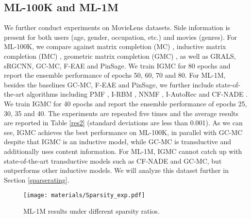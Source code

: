 \documentclass{article} \usepackage{iclr2020_conference,times}
\begin{document}
\subsection{ML-100K and ML-1M}
We further conduct experiments on MovieLens datasets. Side information is present for both users (age, gender, occupation, etc.) and movies (genres). For ML-100K, we compare against matrix completion (MC) \citep{candes2009exact}, inductive matrix completion (IMC) \citep{jain2013provable}, geometric matrix completion (GMC) \citep{kalofolias2014matrix}, as well as GRALS, sRGCNN, GC-MC, F-EAE and PinSage. We train IGMC for 80 epochs and report the ensemble performance of epochs 50, 60, 70 and 80. For ML-1M, besides the baselines GC-MC, F-EAE and PinSage, we further include state-of-the-art algorithms including PMF \citep{mnih2008probabilistic},  I-RBM \citep{salakhutdinov2007restricted}, NNMF \citep{dziugaite2015neural}, I-AutoRec \citep{sedhain2015autorec} and CF-NADE \citep{zheng2016neural}. We train IGMC for 40 epochs and report the ensemble performance of epochs 25, 30, 35 and 40. The experiments are repeated five times and the average results are reported in Table \ref{res2} (standard deviations are less than 0.001). As we can see, IGMC achieves the best performance on ML-100K, in parallel with GC-MC despite that IGMC is an inductive model, while GC-MC is transductive and additionally uses content information. For ML-1M, IGMC cannot catch up with state-of-the-art transductive models such as CF-NADE and GC-MC, but outperforms other inductive models. We will analyze this dataset further in Section \ref{sparserating}.


\begin{wrapfigure}[15]{L}{0.46\textwidth}
\centering
\vspace{-10pt}
  \texttt{[image: materials/Sparsity\_exp.pdf]}
  \caption{ML-1M results under different sparsity ratios.}
  \label{res3}
\end{wrapfigure}
\end{document}
